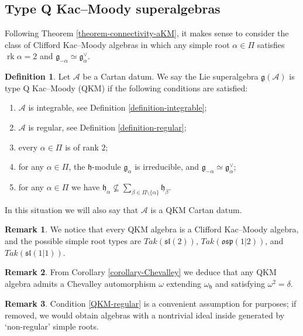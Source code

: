 \documentclass[12pt, a4paper, reqno]{amsart}
\def\AA{\mathcal{A}}
\def\p{\mathfrak{p}}
\def\l{\mathfrak{l}}
\def\s{\mathfrak{s}}
\def\o{\mathfrak{o}}
\def\rk{\operatorname{rk}}
\theoremstyle{definition}
\newtheorem{definition}{Definition}
\theoremstyle{definition}
\newtheorem{remark}{Remark}
\theoremstyle{definition}
\numberwithin{theorem}{section}
\numberwithin{lemma}{section}
\numberwithin{remark}{section}
\numberwithin{definition}{section}
\numberwithin{corollary}{section}
\numberwithin{proposition}{section}
\numberwithin{example}{section}
\begin{document}
	\subsection{Type Q Kac--Moody superalgebras} Following Theorem \ref{theorem-connectivity-aKM}, it makes sense to consider the class of Clifford Kac--Moody algebras in which any simple root \(\alpha\in \Pi\) satisfies \(\rk\alpha = 2\) and \(\mathfrak{g}_{-\alpha} \simeq \mathfrak{g}_{\alpha}^\vee\). 
	\begin{definition}\label{definition-QKM}
		Let $\AA$ be a Cartan datum.  We say the Lie superalgebra \(\mathfrak{g}(\mathcal{A})\) is type Q Kac--Moody (QKM) if the following conditions are satisfied:
		\begin{enumerate}[label=(KM\arabic*)]
			\item\label{QKM-integrable} \(\AA\) is integrable, see Definition \ref{definition-integrable};
			\item\label{QKM-regular} \(\mathcal{A}\) is regular, see Definition \ref{definition-regular};
			\item\label{QKM-rank2} every \(\alpha \in \Pi\) is of rank \(2\);
			\item\label{QKM-irrtwist} for any $\alpha\in\Pi$, the \(\mathfrak{h}\)-module \(\mathfrak{g}_{\alpha}\) is irreducible, and \(\mathfrak{g}_{-\alpha}\simeq \mathfrak{g}_{\alpha}^\vee\);
			\item\label{QKM-linear-independence} for any \(\alpha \in \Pi\) we have \(\mathfrak{h}_{\alpha} \nsubseteq \sum_{\beta\in\Pi\setminus\{\alpha\}}\mathfrak{h}_{\beta}\).
		\end{enumerate}
		In this situation we will also say that $\AA$ is a QKM Cartan datum.
	\end{definition}
	\begin{remark}
		We notice that every QKM algebra is a Clifford Kac--Moody algebra, and the possible simple root types are $Tak(\s\l(2))$, $Tak(\o\s\p(1|2))$, and $Tak(\s\l(1|1))$. 
	\end{remark}
	
	\begin{remark}\label{remark-Chevalley}
		From Corollary \ref{corollary-Chevalley} we deduce that any QKM algebra admits a Chevalley automorphism $\omega$ extending \(\omega_{\mathfrak{h}}\) and satisfying $\omega^2=\delta$.
	\end{remark}
	
	\begin{remark}
		Condition \ref{QKM-regular} is a convenient assumption for purposes; if removed, we would obtain algebras with a nontrivial ideal inside generated by `non-regular' simple roots.  
	\end{remark}
	
\end{document}
